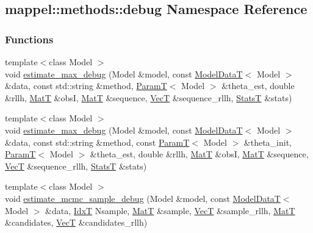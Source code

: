 \hypertarget{namespacemappel_1_1methods_1_1debug}{}\subsection{mappel\+:\+:methods\+:\+:debug Namespace Reference}
\label{namespacemappel_1_1methods_1_1debug}
\subsubsection*{Functions}
\begin{DoxyCompactItemize}
\item 
{\footnotesize template$<$class Model $>$ }\\void \hyperlink{namespacemappel_1_1methods_1_1debug_af29a5642fbbd2e5d8d2c5708679ceccf}{estimate\+\_\+max\+\_\+debug} (Model \&model, const \hyperlink{namespacemappel_a97f050df953605381ae9c901c3b125f1}{Model\+DataT}$<$ Model $>$ \&data, const std\+::string \&method, \hyperlink{namespacemappel_a667925cb0d6c0e49f2f035cc5a9a6857}{ParamT}$<$ Model $>$ \&theta\+\_\+est, double \&rllh, \hyperlink{namespacemappel_a7091ab87c528041f7e2027195fad8915}{MatT} \&obsI, \hyperlink{namespacemappel_a7091ab87c528041f7e2027195fad8915}{MatT} \&sequence, \hyperlink{namespacemappel_a2225ad69f358daa3f4f99282a35b9a3a}{VecT} \&sequence\+\_\+rllh, \hyperlink{namespacemappel_a04ab395b0cf82c4ce68a36b2212649a5}{StatsT} \&stats)
\item 
{\footnotesize template$<$class Model $>$ }\\void \hyperlink{namespacemappel_1_1methods_1_1debug_a6a5604069f158badd94b0efadc3e0e7c}{estimate\+\_\+max\+\_\+debug} (Model \&model, const \hyperlink{namespacemappel_a97f050df953605381ae9c901c3b125f1}{Model\+DataT}$<$ Model $>$ \&data, const std\+::string \&method, const \hyperlink{namespacemappel_a667925cb0d6c0e49f2f035cc5a9a6857}{ParamT}$<$ Model $>$ \&theta\+\_\+init, \hyperlink{namespacemappel_a667925cb0d6c0e49f2f035cc5a9a6857}{ParamT}$<$ Model $>$ \&theta\+\_\+est, double \&rllh, \hyperlink{namespacemappel_a7091ab87c528041f7e2027195fad8915}{MatT} \&obsI, \hyperlink{namespacemappel_a7091ab87c528041f7e2027195fad8915}{MatT} \&sequence, \hyperlink{namespacemappel_a2225ad69f358daa3f4f99282a35b9a3a}{VecT} \&sequence\+\_\+rllh, \hyperlink{namespacemappel_a04ab395b0cf82c4ce68a36b2212649a5}{StatsT} \&stats)
\item 
{\footnotesize template$<$class Model $>$ }\\void \hyperlink{namespacemappel_1_1methods_1_1debug_a7c94ce5d92872076693974f3abfa831b}{estimate\+\_\+mcmc\+\_\+sample\+\_\+debug} (Model \&model, const \hyperlink{namespacemappel_a97f050df953605381ae9c901c3b125f1}{Model\+DataT}$<$ Model $>$ \&data, \hyperlink{namespacemappel_ab17ec0f30b61ece292439d7ece81d3a8}{IdxT} Nsample, \hyperlink{namespacemappel_a7091ab87c528041f7e2027195fad8915}{MatT} \&sample, \hyperlink{namespacemappel_a2225ad69f358daa3f4f99282a35b9a3a}{VecT} \&sample\+\_\+rllh, \hyperlink{namespacemappel_a7091ab87c528041f7e2027195fad8915}{MatT} \&candidates, \hyperlink{namespacemappel_a2225ad69f358daa3f4f99282a35b9a3a}{VecT} \&candidates\+\_\+rllh)

\end{DoxyCompactItemize}
